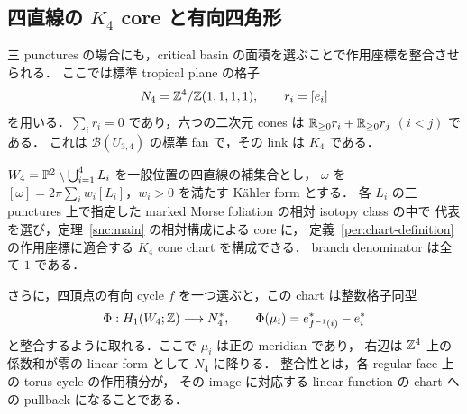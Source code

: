 \subsection{四直線の \texorpdfstring{$K_4$}{K4} core と有向四角形}
\label{per:k4-section}

三 punctures の場合にも，critical basin の面積を選ぶことで作用座標を整合させられる．
ここでは標準 tropical plane の格子
\[
 N_4=\mathbb Z^4/\mathbb Z(1,1,1,1),\qquad r_i=[e_i]
\]
を用いる．$\sum_i r_i=0$ であり，六つの二次元 cones は
$\mathbb R_{\geq0}r_i+\mathbb R_{\geq0}r_j$ $(i<j)$ である．
これは $\mathcal B(U_{3,4})$ の標準 fan で，その link は $K_4$ である．

\begin{proposition}
\label{per:k4-realization}
$W_4=\mathbb P^2\setminus\bigcup_{i=1}^4L_i$ を一般位置の四直線の補集合とし，
$\omega$ を $[\omega]=2\pi\sum_iw_i[L_i]$，$w_i>0$ を満たす Kähler form とする．
各 $L_i$ の三 punctures 上で指定した marked Morse foliation の相対 isotopy class の中で
代表を選び，定理~\ref{snc:main} の相対構成による core に，
定義~\ref{per:chart-definition} の作用座標に適合する $K_4$ cone chart を構成できる．
branch denominator は全て $1$ である．

さらに，四頂点の有向 cycle $f$ を一つ選ぶと，この chart は整数格子同型
\begin{equation}\label{per:k4-lattice-map}
 \Phi:H_1(W_4;\mathbb Z)\longrightarrow N_4^*,\qquad
 \Phi(\mu_i)=e^*_{f^{-1}(i)}-e^*_i
\end{equation}
と整合するように取れる．ここで $\mu_i$ は正の meridian であり，
右辺は $\mathbb Z^4$ 上の係数和が零の linear form として $N_4$ に降りる．
整合性とは，各 regular face 上の torus cycle の作用積分が，
その image に対応する linear function の chart への pullback になることである．
\end{proposition}

